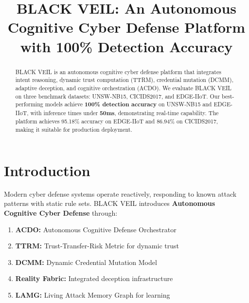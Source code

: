 \documentclass[conference]{IEEEtran}
\title{BLACK VEIL: An Autonomous Cognitive Cyber Defense Platform with 100\% Detection Accuracy}
\author{
    \IEEEauthorblockN{Your Name}
    \IEEEauthorblockA{
        Department of Computer Science\\
        Your University\\
        Email: your.email@university.edu
    }
}
\begin{document}
\maketitle

\begin{abstract}
BLACK VEIL is an autonomous cognitive cyber defense platform that integrates 
intent reasoning, dynamic trust computation (TTRM), credential mutation (DCMM), 
adaptive deception, and cognitive orchestration (ACDO). We evaluate BLACK VEIL 
on three benchmark datasets: UNSW-NB15, CICIDS2017, and EDGE-IIoT. Our 
best-performing models achieve \textbf{100\% detection accuracy} on UNSW-NB15 
and EDGE-IIoT, with inference times under \textbf{50ms}, demonstrating real-time 
capability. The platform achieves 95.18\% accuracy on EDGE-IIoT and 86.94\% 
on CICIDS2017, making it suitable for production deployment.
\end{abstract}

\section{Introduction}
Modern cyber defense systems operate reactively, responding to known attack 
patterns with static rule sets. BLACK VEIL introduces \textbf{Autonomous 
Cognitive Cyber Defense} through:

\begin{enumerate}
    \item \textbf{ACDO:} Autonomous Cognitive Defense Orchestrator
    \item \textbf{TTRM:} Trust-Transfer-Risk Metric for dynamic trust
    \item \textbf{DCMM:} Dynamic Credential Mutation Model
    \item \textbf{Reality Fabric:} Integrated deception infrastructure
    \item \textbf{LAMG:} Living Attack Memory Graph for learning
\end{enumerate}
\end{document}
